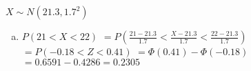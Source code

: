 \documentclass{article}%
\begin{document}
%
\normalsize%
\Large $ X \sim N(21.3, 1.7^2) $%
\begin{enumerate}[a)]%
\Large \item $P(21 < X < 22)$%
$=P\left(\frac{21-21.3}{1.7} < \frac{X-21.3}{1.7} < \frac{22-21.3}{1.7}\right)$%
$=P\left(-0.18 < Z < 0.41 \right)$%
$=\Phi\left( 0.41 \right) - \Phi\left( -0.18 \right)$%
$=0.6591 - 0.4286 = 0.2305 $%
\end{enumerate}%
\end{document}

